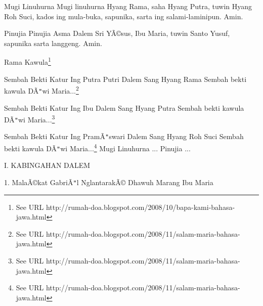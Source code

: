Mugi Linuhurna
\newline
Mugi linuhurna Hyang Rama, saha Hyang Putra, tuwin Hyang Roh Suci, kados ing mula-buka, sapunika, sarta ing salami-laminipun. Amin.\newline

Pinujia
\newline
Pinujia Asma Dalem Sri Y\~A\copyright{}sus, Ibu Maria, tuwin Santo Yusuf, sapunika sarta langgeng. Amin.\newline

Rama Kawula\footnote{See URL http://rumah-doa.blogspot.com/2008/10/bapa-kami-bahasa-jawa.html}
\newline

Sembah Bekti Katur Ing Putra Putri Dalem Sang Hyang Rama
\newline
Sembah bekti kawula D\~A\texttt{{}"{}}wi Maria...\footnote{See URL http://rumah-doa.blogspot.com/2008/11/salam-maria-bahasa-jawa.html}\newline

Sembah Bekti Katur Ing Ibu Dalem Sang Hyang Putra
\newline
Sembah bekti kawula D\~A\texttt{{}"{}}wi Maria...\footnote{See URL http://rumah-doa.blogspot.com/2008/11/salam-maria-bahasa-jawa.html}\newline

Sembah Bekti Katur Ing Pram\~A\texttt{{}"{}}swari Dalem Sang Hyang Roh Suci
\newline
Sembah bekti kawula D\~A\texttt{{}"{}}wi Maria...\footnote{See URL http://rumah-doa.blogspot.com/2008/11/salam-maria-bahasa-jawa.html}\newline
Mugi Linuhurna ...\newline
Pinujia ...\newline

I. KABINGAHAN DALEM
\newline


1. Mala\~A\copyright{}kat Gabri\~A\texttt{{}"{}}l Nglantarak\~A\copyright{} Dhawuh Marang Ibu Maria

